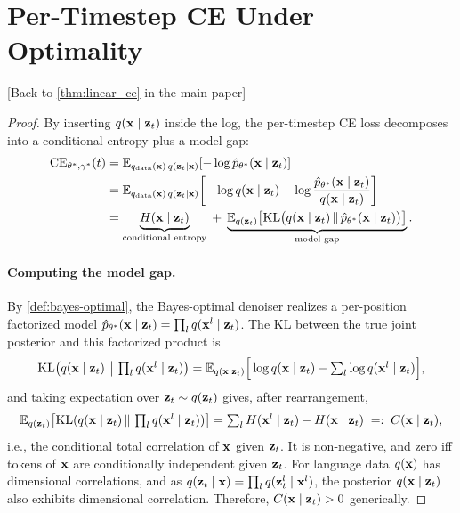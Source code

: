 \documentclass{article}
\begin{document}
\clearpage

\section{Per-Timestep CE Under Optimality}\label{supp:sec:linear-ce}

[Back to \cref{thm:linear_ce} in the main paper]

\vspace{0.5em}

\thmlinearce*

\begin{proof}
By inserting $q({\mathbf x}\mid{\mathbf z}_t)$ inside the log, the per-timestep CE loss decomposes into a conditional entropy plus a model gap:
\begin{align}
    \operatorname{CE}_{\theta^*, \gamma^*} (t)
    &= \mathbb{E}_{q_{\mathrm{data}}({\mathbf x})\,q({\mathbf z}_t \mid {\mathbf x})}[-\log \hat p_{\theta^*} ({\mathbf x}\mid{\mathbf z}_t)] \\
    &= \mathbb{E}_{q_{\mathrm{data}}({\mathbf x})\,q({\mathbf z}_t\mid{\mathbf x})}\!\left[-\log q({\mathbf x}\mid{\mathbf z}_t) -\log \frac{\hat{p}_{\theta^*}({\mathbf x}\mid{\mathbf z}_t)}{q({\mathbf x}\mid{\mathbf z}_t)}\right]\\
    &= \underbrace{H({\mathbf x}\mid{\mathbf z}_t)}_{\text{conditional entropy}} \;+\; \underbrace{\mathbb{E}_{q({\mathbf z}_t)}\bigl[\operatorname{KL}\bigl(q({\mathbf x}\mid{\mathbf z}_t)\,\|\,\hat{p}_{\theta^*}({\mathbf x}\mid{\mathbf z}_t)\bigr)\bigr]}_{\text{model gap}}.
\end{align}

\paragraph{Computing the model gap.}
By \cref{def:bayes-optimal}, the Bayes-optimal denoiser realizes a per-position factorized model $\hat{p}_{\theta^*}({\mathbf x}\mid{\mathbf z}_t)=\prod_l q({\mathbf x}^l\mid{\mathbf z}_t)$. The KL between the true joint posterior and this factorized product is
\begin{align}
    \operatorname{KL}\bigl(q({\mathbf x}\mid{\mathbf z}_t) \,\big\|\, \textstyle\prod_l q({\mathbf x}^l\mid{\mathbf z}_t)\bigr)
    = \mathbb{E}_{q({\mathbf x}\mid{\mathbf z}_t)}\Big[\log q({\mathbf x}\mid{\mathbf z}_t) - \sum_l \log q({\mathbf x}^l\mid{\mathbf z}_t)\Big],
\end{align}
and taking expectation over ${\mathbf z}_t \sim q({\mathbf z}_t)$ gives, after rearrangement,
\begin{align}
    \mathbb{E}_{q({\mathbf z}_t)}\bigl[\operatorname{KL}(q({\mathbf x}\mid{\mathbf z}_t)\,\|\,\textstyle\prod_l q({\mathbf x}^l\mid{\mathbf z}_t))\bigr]
    = \sum_l H({\mathbf x}^l\mid{\mathbf z}_t) - H({\mathbf x}\mid{\mathbf z}_t)
    \;=:\; C({\mathbf x}\mid{\mathbf z}_t),
\end{align}
i.e., the conditional total correlation of ${\mathbf x}$ given ${\mathbf z}_t$. It is non-negative, and zero iff tokens of ${\mathbf x}$ are conditionally independent given ${\mathbf z}_t$. For language data $q({\mathbf x})$ has dimensional correlations, and as $q({\mathbf z}_t\mid{\mathbf x}) = \prod_l q({\mathbf z}_t^l\mid{\mathbf x}^l)$, the posterior  $q({\mathbf x}\mid{\mathbf z}_t)$ also exhibits dimensional correlation. Therefore, $C({\mathbf x}\mid{\mathbf z}_t)>0$ generically.


\end{proof}
\end{document}
